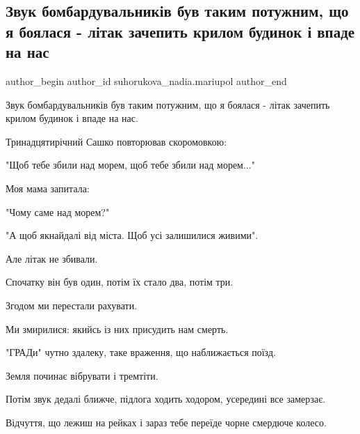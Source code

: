  
 
 
 
 

\subsection{Звук бомбардувальників був таким потужним, що я боялася - літак зачепить крилом будинок і впаде на нас}
\label{sec:28_02_2023.fb.suhorukova_nadia.mariupol.1.zvuk_bombarduvalnik_}

\ifcmt
 author_begin
   author_id suhorukova_nadia.mariupol
 author_end
\fi

Звук бомбардувальників був таким потужним, що я боялася - літак зачепить крилом
будинок і впаде на нас. 

Тринадцятирічний Сашко повторював скоромовкою: 

"Щоб тебе збили над морем, щоб тебе збили над морем..."

Моя мама запитала:

"Чому саме над морем?"

"А щоб якнайдалі від міста. Щоб усі залишилися живими". 

Але літак не збивали. 

Спочатку він був один, потім їх стало два, потім три. 

Згодом ми перестали рахувати. 

Ми змирилися: якийсь із них присудить нам смерть.

"ГРАДи" чутно здалеку, таке враження, що наближається поїзд. 

Земля починає вібрувати і тремтіти. 

Потім звук дедалі ближче, підлога ходить ходором, усередині все замерзає. 

Відчуття, що лежиш на рейках і зараз тебе переїде чорне смердюче колесо.

